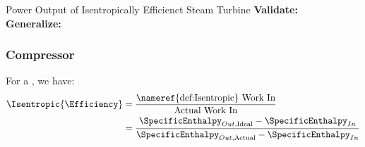 \begin{example}{Power Output of Isentropically Efficienct Steam Turbine}
  \textbf{Validate:} \\

  \textbf{Generalize:} \\

\end{example}

\subsubsection{Compressor}\label{subsubsec:Compressor_Isentropic_Efficiency}
For a , we have:
\begin{equation}\label{eq:Isentropic_Efficiency-Compressor}
  \begin{aligned}
    \Isentropic{\Efficiency} &= \frac{\text{\nameref{def:Isentropic} Work In}}{\text{Actual Work In}} \\
    &= \frac{\SpecificEnthalpy_{Out, \text{Ideal}} - \SpecificEnthalpy_{In}}{\SpecificEnthalpy_{Out, \text{Actual}} - \SpecificEnthalpy_{In}}
  \end{aligned}
\end{equation}

